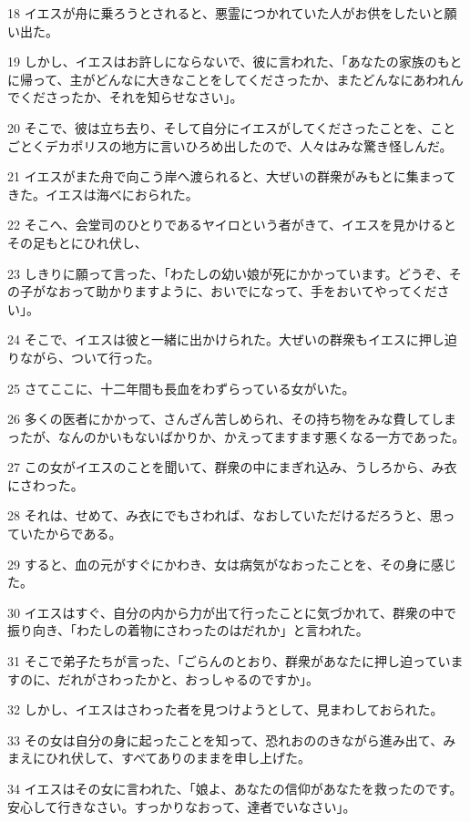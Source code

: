 \par 18 イエスが舟に乗ろうとされると、悪霊につかれていた人がお供をしたいと願い出た。
\par 19 しかし、イエスはお許しにならないで、彼に言われた、「あなたの家族のもとに帰って、主がどんなに大きなことをしてくださったか、またどんなにあわれんでくださったか、それを知らせなさい」。
\par 20 そこで、彼は立ち去り、そして自分にイエスがしてくださったことを、ことごとくデカポリスの地方に言いひろめ出したので、人々はみな驚き怪しんだ。
\par 21 イエスがまた舟で向こう岸へ渡られると、大ぜいの群衆がみもとに集まってきた。イエスは海べにおられた。
\par 22 そこへ、会堂司のひとりであるヤイロという者がきて、イエスを見かけるとその足もとにひれ伏し、
\par 23 しきりに願って言った、「わたしの幼い娘が死にかかっています。どうぞ、その子がなおって助かりますように、おいでになって、手をおいてやってください」。
\par 24 そこで、イエスは彼と一緒に出かけられた。大ぜいの群衆もイエスに押し迫りながら、ついて行った。
\par 25 さてここに、十二年間も長血をわずらっている女がいた。
\par 26 多くの医者にかかって、さんざん苦しめられ、その持ち物をみな費してしまったが、なんのかいもないばかりか、かえってますます悪くなる一方であった。
\par 27 この女がイエスのことを聞いて、群衆の中にまぎれ込み、うしろから、み衣にさわった。
\par 28 それは、せめて、み衣にでもさわれば、なおしていただけるだろうと、思っていたからである。
\par 29 すると、血の元がすぐにかわき、女は病気がなおったことを、その身に感じた。
\par 30 イエスはすぐ、自分の内から力が出て行ったことに気づかれて、群衆の中で振り向き、「わたしの着物にさわったのはだれか」と言われた。
\par 31 そこで弟子たちが言った、「ごらんのとおり、群衆があなたに押し迫っていますのに、だれがさわったかと、おっしゃるのですか」。
\par 32 しかし、イエスはさわった者を見つけようとして、見まわしておられた。
\par 33 その女は自分の身に起ったことを知って、恐れおののきながら進み出て、みまえにひれ伏して、すべてありのままを申し上げた。
\par 34 イエスはその女に言われた、「娘よ、あなたの信仰があなたを救ったのです。安心して行きなさい。すっかりなおって、達者でいなさい」。
